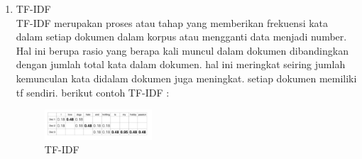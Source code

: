 \begin{enumerate}
\item TF-IDF\\
TF-IDF merupakan proses atau tahap yang memberikan frekuensi kata dalam setiap dokumen dalam korpus atau mengganti data menjadi number. Hal ini berupa rasio yang berapa kali muncul dalam dokumen dibandingkan dengan jumlah total kata dalam dokumen. hal ini meringkat seiring jumlah kemunculan kata didalam dokumen juga meningkat. setiap dokumen memiliki tf sendiri. berikut contoh TF-IDF :
\hfill\break
	\begin{figure}[H]
		\includegraphics[width=4cm]{figures/1174054/4/5.png}
		\centering
		\caption{TF-IDF}
	\end{figure}

\end{enumerate}

